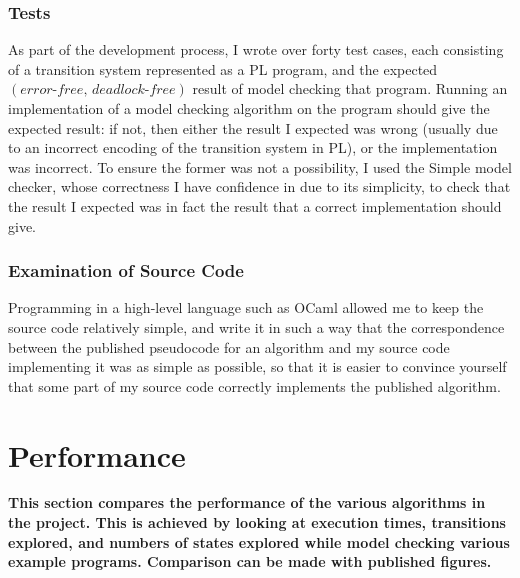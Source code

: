 \documentclass[12pt,a4paper,twoside,openright]{report}
\begin{document}
\subsubsection{Tests}
As part of the development process,
I wrote over forty test cases, each 
consisting of a transition system
represented as a PL program, and
the expected
$(\textit{error-free},\, \textit{deadlock-free})$
result of model checking that program.
Running an implementation of a model
checking algorithm on the program should
give the expected result: if not, then
either the result I expected was wrong
(usually due to an incorrect encoding
of the transition system in PL),
or the implementation was incorrect.
To ensure the former was not a possibility,
I used the Simple model checker, whose
correctness I have confidence in due
to its simplicity, to check that the
result I expected was in fact the
result that a correct implementation
should give.

\subsubsection{Examination of Source Code}
Programming in a high-level language such as
OCaml allowed me to keep the source code
relatively simple, and write it in such
a way that the correspondence between
the published pseudocode for an algorithm
and my source code implementing it was
as simple as possible, so that it
is easier to convince yourself that
some part of my source code correctly
implements the published algorithm.

\section{Performance}
\textbf{This section compares the
	performance of the various algorithms
	in the project. This is achieved by
	looking at execution times, transitions
	explored, and numbers of states explored
	while model checking various example
	programs. Comparison can be made with
	published figures.}
\end{document}
